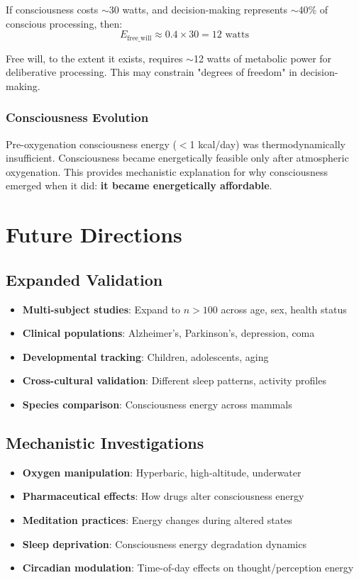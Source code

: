\documentclass[12pt]{article}
\theoremstyle{remark}
\begin{document}
If consciousness costs $\sim$30 watts, and decision-making represents $\sim$40\% of conscious processing, then:
\begin{equation}
E_{\text{free\_will}} \approx 0.4 \times 30 = 12 \text{ watts}
\end{equation}

Free will, to the extent it exists, requires $\sim$12 watts of metabolic power for deliberative processing. This may constrain "degrees of freedom" in decision-making.

\subsubsection{Consciousness Evolution}

Pre-oxygenation consciousness energy ($<$1 kcal/day) was thermodynamically insufficient. Consciousness became energetically feasible only after atmospheric oxygenation. This provides mechanistic explanation for why consciousness emerged when it did: \textbf{it became energetically affordable}.

\section{Future Directions}

\subsection{Expanded Validation}

\begin{itemize}
\item \textbf{Multi-subject studies}: Expand to $n > 100$ across age, sex, health status
\item \textbf{Clinical populations}: Alzheimer's, Parkinson's, depression, coma
\item \textbf{Developmental tracking}: Children, adolescents, aging
\item \textbf{Cross-cultural validation}: Different sleep patterns, activity profiles
\item \textbf{Species comparison}: Consciousness energy across mammals
\end{itemize}

\subsection{Mechanistic Investigations}

\begin{itemize}
\item \textbf{Oxygen manipulation}: Hyperbaric, high-altitude, underwater
\item \textbf{Pharmaceutical effects}: How drugs alter consciousness energy
\item \textbf{Meditation practices}: Energy changes during altered states
\item \textbf{Sleep deprivation}: Consciousness energy degradation dynamics
\item \textbf{Circadian modulation}: Time-of-day effects on thought/perception energy
\end{itemize}
\end{document}
